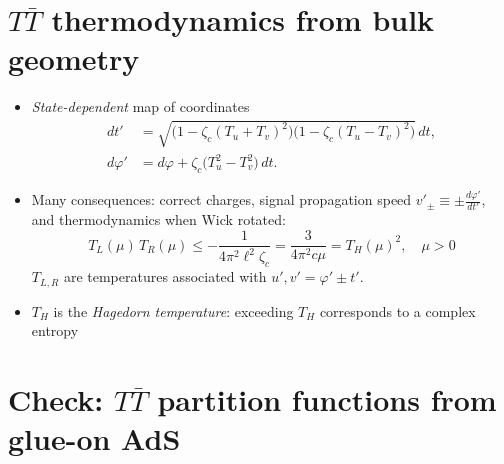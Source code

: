 \documentclass[10pt]{article}
\renewenvironment{frame}[1]%
	{\section*{#1}}%
	{\clearpage}
\newcommand{\pause}{}
\newenvironment{columns}%
	{\par\begin{minipage}{\textwidth}}%
	{\end{minipage}}
\newenvironment{column}[1]%
	{\begin{minipage}{#1}}%
	{\end{minipage}}
\newcommand{\TTbar}{\texorpdfstring{\ensuremath{T\bar{T}}}{TTbar}\xspace}
\begin{document}
\begin{frame}{\TTbar thermodynamics from bulk geometry}{%
	\textcite{Giveon:2017nie,Apolo:2019zai}
}
\begin{columns}
\begin{column}{\textwidth}
\vspace{-.3\baselineskip}
\begin{itemize}

\item \textit{State-dependent} map of coordinates
	\begin{align*}
		dt' &= \sqrt{ \big(1 - \zeta_c (T_u+T_v)^2 \big) \big(1 - \zeta_c (T_u-T_v)^2 \big) } \, dt, \\
		 d\varphi' &= d\varphi + \zeta_c \big( T_u^2 - T_v^2 \big)\,dt.
	\end{align*}

\pause
\item Many consequences: correct charges, signal propagation speed $v'_{\pm} \equiv \pm \frac{d\varphi'}{dt'}$, and thermodynamics when Wick rotated:
	\begin{equation}
		T_L(\mu)\,T_R(\mu) \le - \frac{1}{4\pi^2 \ell^2 \zeta_c} = \frac{3}{4\pi^2c\mu} = T_H(\mu)^2,
	\quad \mu > 0
	\end{equation}
	$T_{L,R}$ are temperatures associated with $u',v' = \varphi' \pm t'$.

\item $T_H$ is the \textit{Hagedorn temperature}: exceeding $T_H$ corresponds to a complex entropy
\end{itemize}
\end{column}
\end{columns}
\end{frame}

\section{\textbf{Check:} \TTbar partition functions from glue-on AdS} \label{se:partitionfunction}
\end{document}
